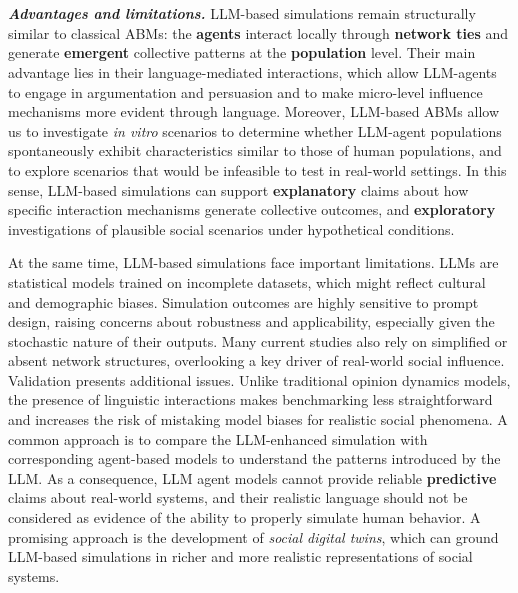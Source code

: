 \documentclass[11pt]{article}
\begin{document}
\\ \ \\
\textbf{\textit{Advantages and limitations.}}
LLM-based simulations remain structurally similar to classical ABMs: the \textbf{agents} interact locally through \textbf{network ties} and generate \textbf{emergent} collective patterns at the \textbf{population} level. Their main advantage lies in their language-mediated interactions, which allow LLM-agents to engage in argumentation and persuasion and to make micro-level influence mechanisms more evident through language. 
Moreover, LLM-based ABMs allow us to investigate \textit{in vitro} scenarios to determine whether LLM-agent populations spontaneously exhibit characteristics similar to those of human populations, and to explore scenarios that would be infeasible to test in real-world settings. In this sense, LLM-based simulations can support \textbf{explanatory} claims about how specific interaction mechanisms generate collective outcomes, and \textbf{exploratory} investigations of plausible social scenarios under hypothetical conditions.

At the same time, LLM-based simulations face important limitations. LLMs are statistical models trained on incomplete datasets, which might reflect cultural and demographic biases. Simulation outcomes are highly sensitive to prompt design, raising concerns about robustness and applicability, especially given the stochastic nature of their outputs. 
Many current studies also rely on simplified or absent network structures, overlooking a key driver of real-world social influence.
Validation presents additional issues. 
Unlike traditional opinion dynamics models, the presence of linguistic interactions makes benchmarking less straightforward and increases the risk of mistaking model biases for realistic social phenomena. A common approach is to compare the LLM-enhanced simulation with corresponding agent-based models to understand the patterns introduced by the LLM.
As a consequence, LLM agent models cannot provide reliable \textbf{predictive} claims about real-world systems, and their realistic language should not be considered as evidence of the ability to properly simulate human behavior.
A promising approach is the development of \textit{social digital twins}, which can ground LLM-based simulations in richer and more realistic representations of social systems.
\end{document}
